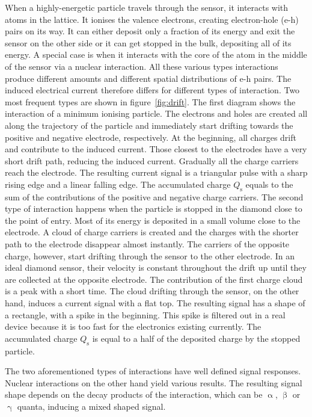 When a highly-energetic particle travels through the sensor, it interacts with atoms in the lattice. It ionises the valence electrons, creating electron-hole (e-h) pairs on its way. It can either deposit only a fraction of its energy and exit the sensor on the other side or it can get stopped in the bulk, depositing all of its energy. A special case is when it interacts with the core of the atom in the middle of the sensor via a nuclear interaction. All these various types interactions produce different amounts and different spatial distributions of e-h pairs. The induced electrical current therefore differs for different types of interaction. Two most frequent types are shown in figure~\ref{fig:drift}. The first diagram shows the interaction of a minimum ionising particle. The electrons and holes are created all along the trajectory of the particle and immediately start drifting towards the positive and negative electrode, respectively. At the beginning, all charges drift and contribute to the induced current. Those closest to the electrodes have a very short drift path, reducing the induced current. Gradually all the charge carriers reach the electrode. The resulting current signal is a triangular pulse with a sharp rising edge and a linear falling edge. The accumulated charge $Q_\mathrm{s}$ equals to the sum of the contributions of the positive and negative charge carriers. The second type of interaction happens when the particle is stopped in the diamond close to the point of entry. Most of its energy is deposited in a small volume close to the electrode. A cloud of charge carriers is created and the charges with the shorter path to the electrode disappear almost instantly. The carriers of the opposite charge, however, start drifting through the sensor to the other electrode. In an ideal diamond sensor, their velocity is constant throughout the drift up until they are collected at the opposite electrode. The contribution of the first charge cloud is a peak with a short time. The cloud drifting through the sensor, on the other hand, induces a current signal with a flat top. The resulting signal has a shape of a rectangle, with a spike in the beginning. This spike is filtered out in a real device because it is too fast for the electronics existing currently. The accumulated charge $Q_\mathrm{s}$ is equal to a half of the deposited charge by the stopped particle.

The two aforementioned types of interactions have well defined signal responses. Nuclear interactions on the other hand yield various results. The resulting signal shape depends on the decay products of the interaction, which can be $\upalpha$, $\upbeta$ or $\upgamma$ quanta, inducing a mixed shaped signal. 
%


